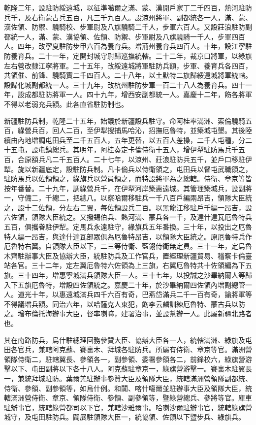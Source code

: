 \begin{pinyinscope}
乾隆二年，設駐防綏遠城，以征準噶爾之滿、蒙、漢開戶家丁二千四百，熱河駐防兵千，及右衛蒙古兵五百，凡三千九百人。設涼州將軍、副都統各一人，滿、蒙、漢佐領、防禦、驍騎校、步軍尉及八旗驍騎二千人，步軍六百人。又設莊浪駐防副都統一人，滿、蒙、漢協領、佐領、防禦、步軍尉及八旗驍騎一千人，步軍四百人。四年，改寧夏駐防步甲六百為養育兵。增荊州養育兵四百人。十年，設江寧駐防養育兵。二十一年，定開封城守尉歸巡撫統轄。二十二年，裁京口將軍，以綠旗左右營改隸江寧將軍。二十五年，改綏遠城將軍駐防兵額，步軍、養育兵各四百，共領催、前鋒、驍騎實二千四百人。二十八年，以土默特二旗歸綏遠城將軍統轄。設歸化城副都統一人。三十九年，改杭州駐防步軍一百二十八人為養育兵。四十一年，設成都駐防將軍一人。四十九年，增西安副都統一人。嘉慶十二年，飭各將軍不得以老弱充兵額。此各直省駐防制也。

新疆駐防兵制，乾隆二十五年，始議於新疆設兵駐守。命阿桂率滿洲、索倫驍騎五百，綠營兵百，回人二百，至伊犁搜捕馬哈沁，招撫厄魯特，並築城屯墾。其後陸續由內地增調屯田兵至二千五百人，五年更替，以五百人差操，二千人屯種，分二十五屯，設屯鎮總兵。其明年，阿桂奏定卡倫侍衛十五人，增伊犁駐防馬兵千五百，合原額兵凡二千五百人。二十七年，以涼州、莊浪駐防兵五千，並戶口移駐伊犁。旋以新疆底定，設駐防兵制。凡卡倫兵以侍衛領之，屯田兵以督屯武職領之，駐防馬兵以佐領領之，綠旗兵以營員領之，而特設將軍為之總轄。侍衛、章京等皆按年番替。二十九年，調綠營兵千，在伊犁河岸築惠遠城。其管理築城兵，設副將一，守備二，千總二，把總八。以察哈爾移駐兵一千八百戶編兩昂吉，領隊大臣統之，設十二佐領，分左右二翼，每佐領設兵二百。以黑龍江移駐戶千編一昂吉，設六佐領，領隊大臣統之。又撥錫伯兵、熱河滿、蒙兵各一千，及達什達瓦厄魯特兵五百，俱攜眷駐伊犁。定馬兵永遠駐守，綠旗兵五年番換。三十年，以投出之厄魯特人編一昂吉，與達什達瓦部眾俱為厄魯特昂吉，以領隊大臣統之。原厄魯特兵作厄魯特右翼。自領隊大臣以下，二三等侍衛、藍翎侍衛無定員。三十一年，定烏魯木齊駐辦事大臣及協辦大臣，統駐防兵及工作官兵，置經理新疆貿易、稽察卡倫臺站各官。三十二年，定左翼厄魯特六佐領為上三旗，右翼厄魯特共十佐領編為下五旗。三十四年，增惠寧城滿兵領隊大臣一人。三十七年，以投誠之沙畢納爾人等歸入下五旗厄魯特，增設四佐領統之。嘉慶二十年，於沙畢納爾四佐領內增副總管一人。道光十年，以惠遠城滿兵四千六百有奇，巴燕岱滿兵二千一百有奇，諭將軍等不得議增兵額。同治六年，以哈薩克人東犯，飭李云麟訓練厄魯特、蒙古兵以防之。增布倫托海辦事大臣，督率喇嘛，建署治事，並設幫辦一人。此屬新疆北路者也。

其在南路防兵，烏什駐總理回務參贊大臣、協辦大臣各一人，統轄滿洲、綠旗及屯田各官兵，兼轄阿克蘇、賽裏木、拜城各駐防兵。所屬有侍衛、章京等官。滿洲營領隊侍衛二，駐轄翼長、參領各一，副參領、委署參領各二，前鋒校六，綠旗營游擊以下、屯田副將以下各十八人。阿克蘇駐章京一，綠旗營游擊一。賽裏木駐翼長一，兼統拜城駐防。葉爾羌駐辦事參贊大臣及領隊大臣，統轄滿洲營領隊副都統、侍衛、參領、副參領等，如烏什例。和闐、喀什噶爾並駐辦事大臣及領隊大臣，統轄滿洲營侍衛、章京、領隊侍衛、參領、副參領等，暨綠營總兵、參將等官。庫車駐辦事官，統轄綠營都司以下官，兼轄沙雅爾事。哈喇沙爾駐辦事官，統轄綠旗營城守，及屯田駐防兵。闢展駐領隊大臣一，統協領、佐領以下暨步兵、綠旗兵。


\end{pinyinscope}
